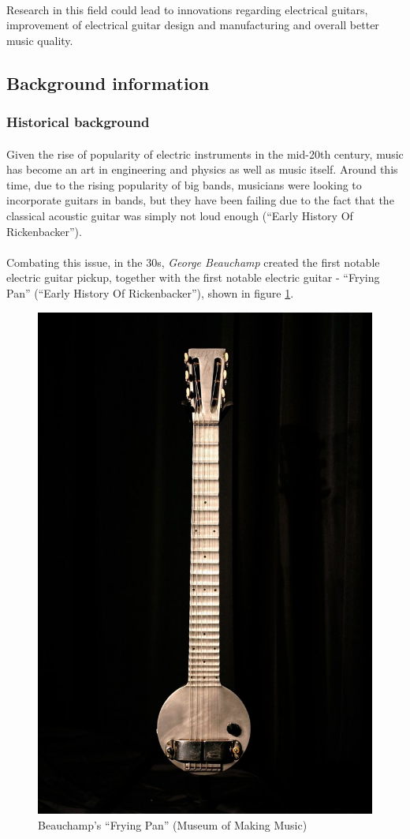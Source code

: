 \documentclass{article}
\begin{document}
\paragraph*{}
Research in this field could lead to innovations regarding electrical guitars,
improvement of electrical guitar design and manufacturing and overall better
music quality.

\subsection{Background information}

\subsubsection{Historical background}

\paragraph*{}
Given the rise of popularity of electric instruments in the mid-20th century, 
music has become an art in engineering and physics as well as music itself.
Around this time, due to the rising popularity of big bands, musicians were
looking to incorporate guitars in bands, but they have been failing due to the
fact that the classical acoustic guitar was simply not loud enough (``Early 
History Of Rickenbacker'').

\paragraph*{}
Combating this issue, in the 30s, \textit{George Beauchamp} created the first
notable electric guitar pickup, together with the first notable electric guitar
- ``Frying Pan'' (``Early History Of Rickenbacker''), shown in figure
\ref{fig:frying-pan}.
\begin{figure}[ht]
	\centering
	\includegraphics[width=.3\linewidth]{img/frying-pan}
	\caption{Beauchamp's ``Frying Pan'' (Museum of Making Music)}
	\label{fig:frying-pan}
\end{figure}
\end{document}
